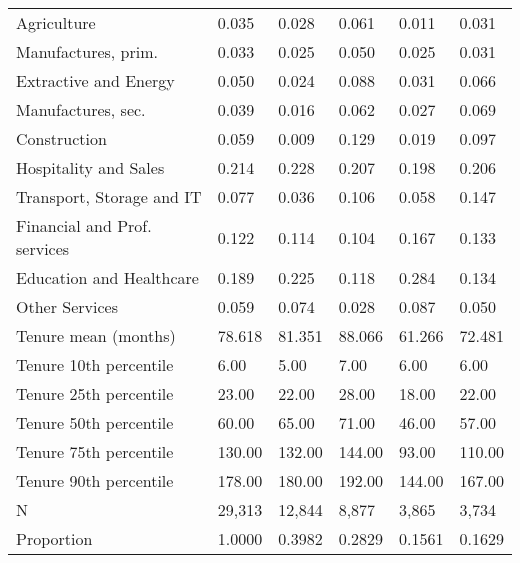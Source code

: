 \begin{tabular}{llllll}
Agriculture                  &   0.035 &   0.028 &   0.061 &              0.011 &            0.031 \\
Manufactures, prim.          &   0.033 &   0.025 &   0.050 &              0.025 &            0.031 \\
Extractive and Energy        &   0.050 &   0.024 &   0.088 &              0.031 &            0.066 \\
Manufactures, sec.           &   0.039 &   0.016 &   0.062 &              0.027 &            0.069 \\
Construction                 &   0.059 &   0.009 &   0.129 &              0.019 &            0.097 \\
Hospitality and Sales        &   0.214 &   0.228 &   0.207 &              0.198 &            0.206 \\
Transport, Storage and IT    &   0.077 &   0.036 &   0.106 &              0.058 &            0.147 \\
Financial and Prof. services &   0.122 &   0.114 &   0.104 &              0.167 &            0.133 \\
Education and Healthcare     &   0.189 &   0.225 &   0.118 &              0.284 &            0.134 \\
Other Services               &   0.059 &   0.074 &   0.028 &              0.087 &            0.050 \\
Tenure mean (months)         &  78.618 &  81.351 &  88.066 &             61.266 &           72.481 \\
Tenure 10th percentile       &    6.00 &    5.00 &    7.00 &               6.00 &             6.00 \\
Tenure 25th percentile       &   23.00 &   22.00 &   28.00 &              18.00 &            22.00 \\
Tenure 50th percentile       &   60.00 &   65.00 &   71.00 &              46.00 &            57.00 \\
Tenure 75th percentile       &  130.00 &  132.00 &  144.00 &              93.00 &           110.00 \\
Tenure 90th percentile       &  178.00 &  180.00 &  192.00 &             144.00 &           167.00 \\
N                            &  29,313 &  12,844 &   8,877 &              3,865 &            3,734 \\
Proportion                   &  1.0000 &  0.3982 &  0.2829 &             0.1561 &           0.1629 \\
\bottomrule
\end{tabular}
